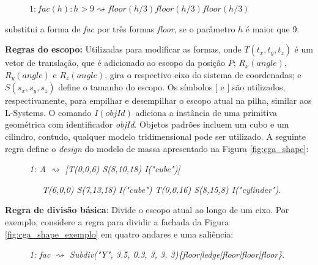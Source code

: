 \vspace{0.3cm}

\begin{description}
    \item[] \qquad \qquad  $1: fac(h): h > 9 \rightsquigarrow floor(h/3) floor(h/3) floor(h/3)$
\end{description}

\vspace{0.3cm}

\noindent substitui a forma de \textit{fac} por três formas \textit{floor}, se o parâmetro $h$ é maior que 9.

\textbf{Regras do escopo:} Utilizadas para modificar as formas, onde $T(t_x, t_y, t_z)$ é um vetor de translação, que é adicionado ao escopo da posição $P$; $R_x(angle)$, $R_y(angle)$ e $R_z(angle)$, gira o respectivo eixo do sistema de coordenadas; e $S(s_x, s_y, s_z)$ define o tamanho do escopo. Os símbolos $[$ e $]$ são utilizados, respectivamente, para empilhar e desempilhar o escopo atual na pilha, similar aos \gls{L-Systems}. O comando $I(objId)$ adiciona a instância de uma primitiva geométrica com identificador \textit{objId}. Objetos padrões incluem um cubo e um cilindro, contudo, qualquer modelo tridimensional pode ser utilizado. A seguinte regra define o \textit{design} do modelo de massa apresentado na Figura \ref{fig:cga_shape}:

\vspace{0.3cm}

\begin{description}
    \item[] \qquad \qquad \textit{1: A $\rightsquigarrow$ [T(0,0,6) S(8,10,18) I("cube")]}
    \item[] \qquad \qquad \, \, \, \textit{T(6,0,0) S(7,13,18) I("cube") T(0,0,16) S(8,15,8) I("cylinder")}.
\end{description}

\vspace{0.3cm}

\textbf{Regra de divisão básica}: Divide o escopo atual ao longo de um eixo. Por exemplo, considere a regra para dividir a fachada da Figura \ref{fig:cga_shape_exemplo} em quatro andares e uma saliência:

\vspace{0.3cm}

\begin{description}
    \item[] \qquad \qquad \textit{1: fac $\rightsquigarrow$ Subdiv("Y", 3.5, 0.3, 3, 3, 3)\{floor|ledge|floor|floor|floor\}}.
\end{description}

